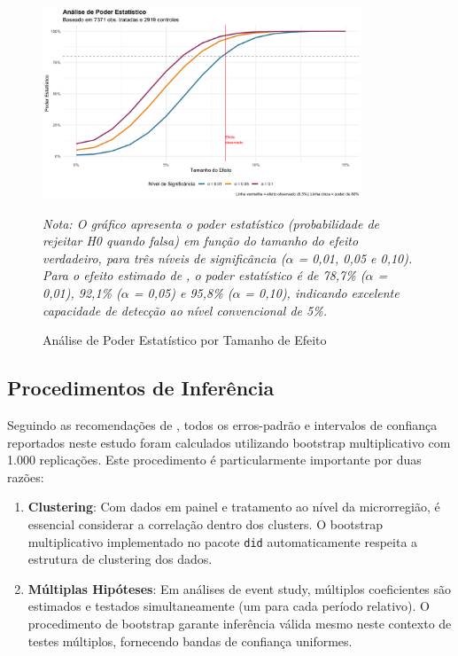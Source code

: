 \documentclass[
	12pt,				%
	oneside,			%
	a4paper,			%
	english,			%
	french,				%
	spanish,			%
	brazil				%
	]{abntex2}
\begin{document}
\begin{figure}[htbp]
\centering
\caption{Análise de Poder Estatístico por Tamanho de Efeito}
\label{fig:power}
\includegraphics[width=0.85\textwidth]{../../../data/outputs/additional_figures/power_analysis_simulation.png}

\textit{Nota: O gráfico apresenta o poder estatístico (probabilidade de rejeitar H0 quando falsa) em função do tamanho do efeito verdadeiro, para três níveis de significância ($\alpha$ = 0,01, 0,05 e 0,10). Para o efeito estimado de \mainattpct{}, o poder estatístico é de 78,7\% ($\alpha$ = 0,01), 92,1\% ($\alpha$ = 0,05) e 95,8\% ($\alpha$ = 0,10), indicando excelente capacidade de detecção ao nível convencional de 5\%.}
\end{figure}

\subsection{Procedimentos de Inferência}

Seguindo as recomendações de , todos os erros-padrão e intervalos de confiança reportados neste estudo foram calculados utilizando bootstrap multiplicativo com 1.000 replicações. Este procedimento é particularmente importante por duas razões:

\begin{enumerate}
\item \textbf{Clustering}: Com dados em painel e tratamento ao nível da microrregião, é essencial considerar a correlação dentro dos clusters. O bootstrap multiplicativo implementado no pacote \texttt{did} automaticamente respeita a estrutura de clustering dos dados.

\item \textbf{Múltiplas Hipóteses}: Em análises de event study, múltiplos coeficientes são estimados e testados simultaneamente (um para cada período relativo). O procedimento de bootstrap garante inferência válida mesmo neste contexto de testes múltiplos, fornecendo bandas de confiança uniformes.
\end{enumerate}
\end{document}
